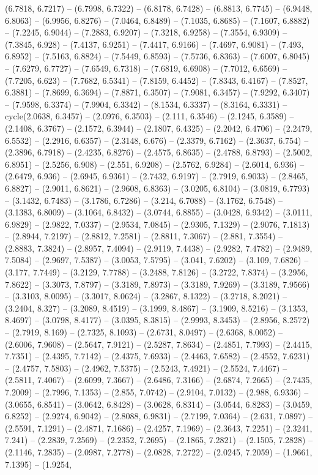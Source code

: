 (6.7818, 6.7217) -- (6.7998, 6.7322) -- (6.8178, 6.7428) -- (6.8813, 6.7745) -- (6.9448, 6.8063) -- (6.9956, 6.8276) -- (7.0464, 6.8489) -- (7.1035, 6.8685) -- (7.1607, 6.8882) -- (7.2245, 6.9044) -- (7.2883, 6.9207) -- (7.3218, 6.9258) -- (7.3554, 6.9309) -- (7.3845, 6.928) -- (7.4137, 6.9251) -- (7.4417, 6.9166) -- (7.4697, 6.9081) -- (7.493, 6.8952) -- (7.5163, 6.8824) -- (7.5449, 6.8593) -- (7.5736, 6.8363) -- (7.6007, 6.8045) -- (7.6279, 6.7727) -- (7.6549, 6.7318) -- (7.6819, 6.6908) -- (7.7012, 6.6569) -- (7.7205, 6.623) -- (7.7682, 6.5341) -- (7.8159, 6.4452) -- (7.8343, 6.4167) -- (7.8527, 6.3881) -- (7.8699, 6.3694) -- (7.8871, 6.3507) -- (7.9081, 6.3457) -- (7.9292, 6.3407) -- (7.9598, 6.3374) -- (7.9904, 6.3342) -- (8.1534, 6.3337) -- (8.3164, 6.3331) -- cycle(2.0638, 6.3457) -- (2.0976, 6.3503) -- (2.111, 6.3546) -- (2.1245, 6.3589) -- (2.1408, 6.3767) -- (2.1572, 6.3944) -- (2.1807, 6.4325) -- (2.2042, 6.4706) -- (2.2479, 6.5532) -- (2.2916, 6.6357) -- (2.3148, 6.676) -- (2.3379, 6.7162) -- (2.3637, 6.754) -- (2.3896, 6.7918) -- (2.4235, 6.8276) -- (2.4575, 6.8635) -- (2.4788, 6.8793) -- (2.5002, 6.8951) -- (2.5256, 6.908) -- (2.551, 6.9208) -- (2.5762, 6.9284) -- (2.6014, 6.936) -- (2.6479, 6.936) -- (2.6945, 6.9361) -- (2.7432, 6.9197) -- (2.7919, 6.9033) -- (2.8465, 6.8827) -- (2.9011, 6.8621) -- (2.9608, 6.8363) -- (3.0205, 6.8104) -- (3.0819, 6.7793) -- (3.1432, 6.7483) -- (3.1786, 6.7286) -- (3.214, 6.7088) -- (3.1762, 6.7548) -- (3.1383, 6.8009) -- (3.1064, 6.8432) -- (3.0744, 6.8855) -- (3.0428, 6.9342) -- (3.0111, 6.9829) -- (2.9822, 7.0337) -- (2.9534, 7.0845) -- (2.9305, 7.1329) -- (2.9076, 7.1813) -- (2.8944, 7.2197) -- (2.8812, 7.2581) -- (2.8811, 7.3067) -- (2.881, 7.3554) -- (2.8883, 7.3824) -- (2.8957, 7.4094) -- (2.9119, 7.4438) -- (2.9282, 7.4782) -- (2.9489, 7.5084) -- (2.9697, 7.5387) -- (3.0053, 7.5795) -- (3.041, 7.6202) -- (3.109, 7.6826) -- (3.177, 7.7449) -- (3.2129, 7.7788) -- (3.2488, 7.8126) -- (3.2722, 7.8374) -- (3.2956, 7.8622) -- (3.3073, 7.8797) -- (3.3189, 7.8973) -- (3.3189, 7.9269) -- (3.3189, 7.9566) -- (3.3103, 8.0095) -- (3.3017, 8.0624) -- (3.2867, 8.1322) -- (3.2718, 8.2021) -- (3.2404, 8.327) -- (3.2089, 8.4519) -- (3.1999, 8.4867) -- (3.1909, 8.5216) -- (3.1353, 8.4697) -- (3.0798, 8.4177) -- (3.0395, 8.3815) -- (2.9993, 8.3453) -- (2.8956, 8.2572) -- (2.7919, 8.169) -- (2.7325, 8.1093) -- (2.6731, 8.0497) -- (2.6368, 8.0052) -- (2.6006, 7.9608) -- (2.5647, 7.9121) -- (2.5287, 7.8634) -- (2.4851, 7.7993) -- (2.4415, 7.7351) -- (2.4395, 7.7142) -- (2.4375, 7.6933) -- (2.4463, 7.6582) -- (2.4552, 7.6231) -- (2.4757, 7.5803) -- (2.4962, 7.5375) -- (2.5243, 7.4921) -- (2.5524, 7.4467) -- (2.5811, 7.4067) -- (2.6099, 7.3667) -- (2.6486, 7.3166) -- (2.6874, 7.2665) -- (2.7435, 7.2009) -- (2.7996, 7.1353) -- (2.855, 7.0742) -- (2.9104, 7.0132) -- (2.988, 6.9336) -- (3.0655, 6.8541) -- (3.0642, 6.8428) -- (3.0628, 6.8314) -- (3.0544, 6.8283) -- (3.0459, 6.8252) -- (2.9274, 6.9042) -- (2.8088, 6.9831) -- (2.7199, 7.0364) -- (2.631, 7.0897) -- (2.5591, 7.1291) -- (2.4871, 7.1686) -- (2.4257, 7.1969) -- (2.3643, 7.2251) -- (2.3241, 7.241) -- (2.2839, 7.2569) -- (2.2352, 7.2695) -- (2.1865, 7.2821) -- (2.1505, 7.2828) -- (2.1146, 7.2835) -- (2.0987, 7.2778) -- (2.0828, 7.2722) -- (2.0245, 7.2059) -- (1.9661, 7.1395) -- (1.9254, 
